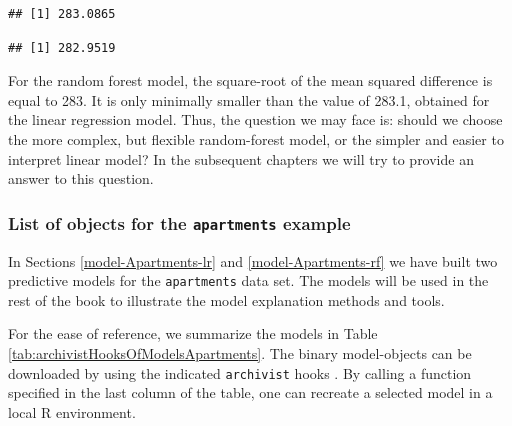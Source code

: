 \documentclass[12pt,]{krantz}
\newenvironment{Shaded}{\begin{snugshade}}{\end{snugshade}}
\newcommand{\DecValTok}[1]{\textcolor[rgb]{0.00,0.00,0.81}{#1}}
\newcommand{\KeywordTok}[1]{\textcolor[rgb]{0.13,0.29,0.53}{\textbf{#1}}}
\newcommand{\NormalTok}[1]{#1}
\newcommand{\OperatorTok}[1]{\textcolor[rgb]{0.81,0.36,0.00}{\textbf{#1}}}
\newcommand{\StringTok}[1]{\textcolor[rgb]{0.31,0.60,0.02}{#1}}
\theoremstyle{definition}
\theoremstyle{definition}
\theoremstyle{definition}
\theoremstyle{remark}
\begin{document}
\begin{verbatim}
## [1] 283.0865
\end{verbatim}

\begin{Shaded}
\end{Shaded}

\begin{verbatim}
## [1] 282.9519
\end{verbatim}

For the random forest model, the square-root of the mean squared
difference is equal to 283. It is only minimally smaller than the value
of 283.1, obtained for the linear regression model. Thus, the question
we may face is: should we choose the more complex, but flexible
random-forest model, or the simpler and easier to interpret linear
model? In the subsequent chapters we will try to provide an answer to
this question.

\hypertarget{ListOfModelsApartments}{%
\subsubsection{\texorpdfstring{List of objects for the
\texttt{apartments}
example}{List of objects for the apartments example}}\label{ListOfModelsApartments}}

In Sections \ref{model-Apartments-lr} and \ref{model-Apartments-rf} we
have built two predictive models for the \texttt{apartments} data set.
The models will be used in the rest of the book to illustrate the model
explanation methods and tools.

For the ease of reference, we summarize the models in Table
\ref{tab:archivistHooksOfModelsApartments}. The binary model-objects can
be downloaded by using the indicated \texttt{archivist} hooks
\citep{archivist}. By calling a function specified in the last column of
the table, one can recreate a selected model in a local R environment.
\end{document}
